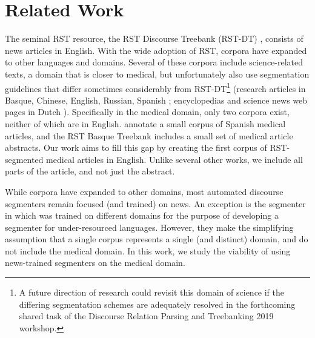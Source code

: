 \section{Related Work}
The seminal RST resource, the RST Discourse Treebank (RST-DT) \cite{Carlson:2001}, consists of news articles in English. With the wide adoption of RST, corpora have expanded to other languages and domains. Several of these corpora include science-related texts, a domain that is closer to medical, but unfortunately also use segmentation guidelines that differ sometimes considerably from RST-DT\footnote{A future direction of research could revisit this domain of science if the differing segmentation schemes are adequately resolved in the forthcoming shared task of the Discourse Relation Parsing and Treebanking 2019 workshop.} (research articles in Basque, Chinese, English, Russian, Spanish \cite{Iruskieta:2013,Cao:2017,Zeldes:2017,Yang:2018,Toldova:2017,Dacunha:2012}; encyclopedias and science news web pages in Dutch \cite{Redeker:2012}). Specifically in the medical domain, only two corpora exist, neither of which are in English.  annotate a small corpus of Spanish medical articles, and the RST Basque Treebank \cite{Iruskieta:2013} includes a small set of medical article abstracts. Our work aims to fill this gap by creating the first corpus of RST-segmented medical articles in English. Unlike several other works, we include all parts of the article, and not just the abstract.

\medskip
{}
While corpora have expanded to other domains, most automated discourse segmenters remain focused (and trained) on news. An exception is the segmenter in  which was trained on different domains for the purpose of developing a segmenter for under-resourced languages. However, they make the simplifying assumption that a single corpus represents a single (and distinct) domain, and do not include the medical domain. In this work, we study the viability of using news-trained segmenters on the medical domain.




